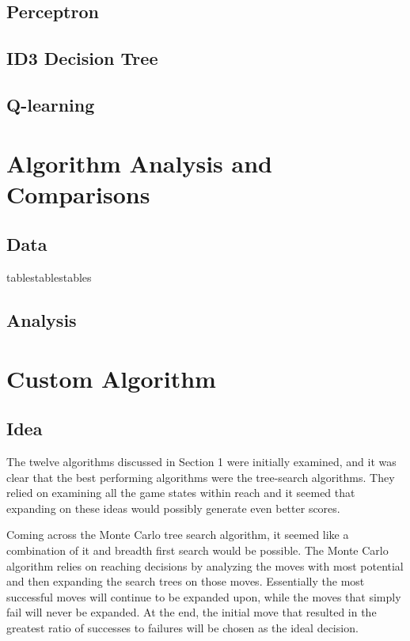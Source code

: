 \documentclass[a4paper,oneside,10pt]{report}
\begin{document}
\section{Perceptron}\label{perceptron}

\section{ID3 Decision Tree}\label{id3}

\section{Q-learning}\label{qlearn}

\chapter{Algorithm Analysis and Comparisons} \label{comparison}

\section {Data} \label{compData}

tablestablestables
\section {Analysis} \label{compAnal}

\chapter{Custom Algorithm} \label{custom}

\section {Idea} \label{custIdea}

The twelve algorithms discussed in Section 1 were initially examined, and it was clear that the best performing algorithms were the tree-search algorithms. They relied on examining all the game states within reach and it seemed that expanding on these ideas would possibly generate even better scores. 

Coming across the Monte Carlo tree search algorithm, it seemed like a combination of it and breadth first search would be possible. The Monte Carlo algorithm relies on reaching decisions by analyzing the moves with most potential and then expanding the search trees on those moves. Essentially the most successful moves will continue to be expanded upon, while the moves that simply fail will never be expanded. At the end, the initial move that resulted in the greatest ratio of successes to failures will be chosen as the ideal decision. 
\end{document}
